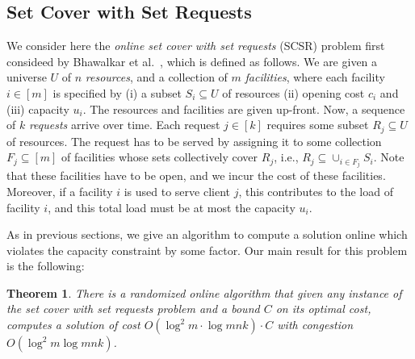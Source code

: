 \documentclass[letterpaper,11pt]{article}
\newtheorem{thm}{Theorem}[section]
\def\sse{\subseteq}
\begin{document}
\subsection{Set Cover with Set Requests}
\label{sec:sc-set-requests}

We consider here the {\em online set cover with set requests} (SCSR)
problem first consideed by Bhawalkar et al.~\cite{BGP14}, which is
defined as follows. We are given a universe $U$ of $n$ \emph{resources},
and a collection of $m$ \emph{facilities}, where each facility $i\in[m]$
is specified by (i) a subset $S_i\sse U$ of resources (ii) opening cost
$c_i$ and (iii) capacity $u_i$. The resources and facilities are given
up-front. Now, a sequence of $k$ {\em requests} arrive over time. Each
request $j\in[k]$ requires some subset $R_j\sse U$ of resources. The
request has to be served by assigning it to some collection $F_j \sse
[m]$ of facilities whose sets collectively cover $R_j$, i.e., $R_j\sse
\cup_{i\in F_j} S_i$. Note that these facilities have to be open, and we
incur the cost of these facilities. Moreover, if a facility $i$ is used
to serve client $j$, this contributes to the load of facility $i$, and
this total load must be at most the capacity $u_i$.

As in previous sections, we give an algorithm to compute a solution
online which violates the capacity constraint by some factor. Our main result for this
problem is the following:
\begin{thm}\label{thm:scsr}
  There is a randomized online algorithm that given any instance of the
  \emph{set cover with set requests} problem and a bound $C$ on its
  optimal cost, computes a solution of cost $O(\log^2m \cdot \log
  mnk)\cdot C$ with congestion $O(\log^2m \log mnk)$.
\end{thm}
\end{document}
